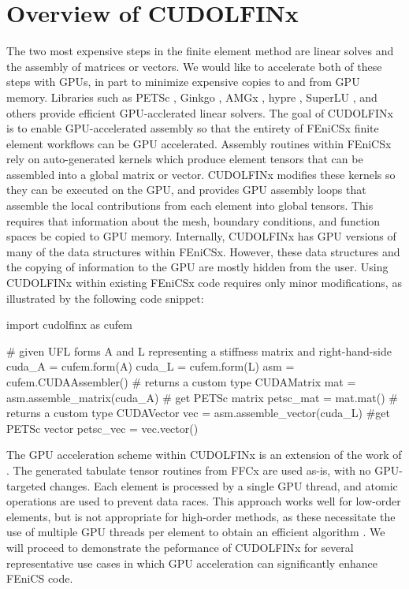 \section*{Overview of CUDOLFINx}

The two most expensive steps in the finite element method are linear solves and the assembly of matrices or vectors. We would like to accelerate both of these steps with GPUs, in part to minimize expensive copies to and from GPU memory. Libraries such as PETSc \cite{MILLS2021102831},  Ginkgo \cite{ginkgo-toms-2022}, AMGx \cite{naumov2015amgx}, hypre \cite{li2020efficient, falgout2021porting}, SuperLU \cite{li2023newly}, and others \cite{lu2023tilesptrsv} provide efficient GPU-acclerated linear solvers. The goal of CUDOLFINx is to enable GPU-accelerated assembly so that the entirety of FEniCSx finite element workflows can be GPU accelerated. Assembly routines within FEniCSx rely on auto-generated kernels which produce element tensors that can be assembled into a global matrix or vector. CUDOLFINx modifies these kernels so they can be executed on the GPU, and provides GPU assembly loops that assemble the local contributions from each element into global tensors. This requires that information about the mesh, boundary conditions, and function spaces be copied to GPU memory. Internally, CUDOLFINx has GPU versions of many of the data structures within FEniCSx. However, these data structures and the copying of information to the GPU are mostly hidden from the user. Using CUDOLFINx within existing FEniCSx code requires only minor modifications, as illustrated by the following code snippet:

\begin{python}
import cudolfinx as cufem

# given UFL forms A and L representing a stiffness matrix and right-hand-side
cuda_A = cufem.form(A)
cuda_L = cufem.form(L)
asm = cufem.CUDAAssembler()
# returns a custom type CUDAMatrix
mat = asm.assemble_matrix(cuda_A)
# get PETSc matrix
petsc_mat = mat.mat()
# returns a custom type CUDAVector
vec = asm.assemble_vector(cuda_L)
#get PETSc vector
petsc_vec = vec.vector()
\end{python}

The GPU acceleration scheme within CUDOLFINx is an extension of the work of \cite{trotter2023targeting}. The generated tabulate tensor routines from FFCx are used as-is, with no GPU-targeted changes. Each element is processed by a single GPU thread, and atomic operations are used to prevent data races. This approach works well for low-order elements, but is not appropriate for high-order methods, as these necessitate the use of multiple GPU threads per element to obtain an efficient algorithm \cite{MACIOL20101093,dziekonski2013generation,banas2014numerical}. We will proceed to demonstrate the peformance of CUDOLFINx for several representative use cases in which GPU acceleration can significantly enhance FEniCS code.

